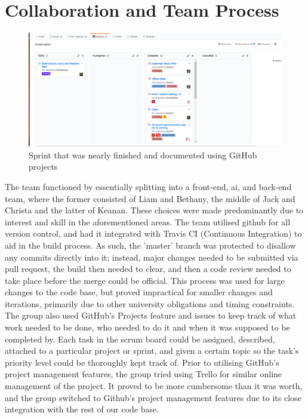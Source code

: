 \documentclass[a4paper,doc]{apa6}
\begin{document}
\section{Collaboration and Team Process}
\begin{figure}[hbtp]
\includegraphics[width=\textwidth]{githubProjects}
\caption{Sprint that was nearly finished and documented using GitHub projects}
\end{figure}
The team functioned by essentially splitting into a front-end, ai, and back-end team, where the former consisted of Liam and Bethany, the middle of Jack and Christa and the latter of Keanan. These choices were made predominantly due to interest and skill in the aforementioned areas. The team utilised github for all version control, and had it integrated with Travis CI (Continuous Integration) to aid in the build process. As such, the 'master' branch was protected to disallow any commits directly into it; instead, major changes needed to be submitted via pull request, the build then needed to clear, and then a code review needed to take place before the merge could be official. This process was used for large changes to the code base, but proved impractical for smaller changes and iterations, primarily due to other university obligations and timing constraints. The group also used GitHub's Projects feature and issues to keep track of what work needed to be done, who needed to do it and when it was supposed to be completed by. Each task in the scrum board could be assigned, described, attached to a particular project or sprint, and given a certain topic so the task's priority level could be thoroughly kept track of. Prior to utilising GitHub's project management features, the group tried using Trello for similar online management of the project. It proved to be more cumbersome than it was worth, and the group switched to Github's project management features due to its close integration with the rest of our code base.
\end{document}
